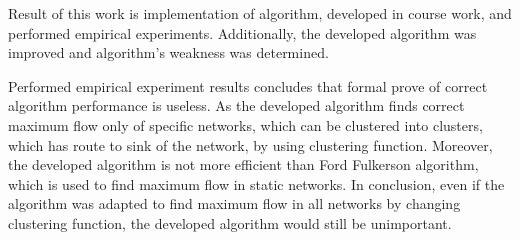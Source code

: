 Result of this work is implementation of algorithm, developed in course work, and performed empirical experiments. Additionally, the developed algorithm was improved and algorithm's weakness was determined.

Performed empirical experiment results concludes that formal prove of correct algorithm performance is useless. As the developed algorithm finds correct maximum flow only of specific networks, which can be clustered into clusters, which has route to sink of the network, by using clustering function. Moreover, the developed algorithm is not more efficient than Ford Fulkerson algorithm, which is used to find maximum flow in static networks. In conclusion, even if the algorithm was adapted to find maximum flow in all networks by changing clustering function, the developed algorithm would still be unimportant.